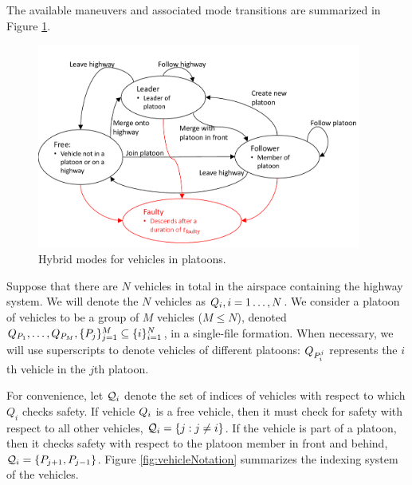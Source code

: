 \begin{itemize}
\end{itemize}

The available maneuvers and associated mode transitions are summarized in Figure \ref{fig:vehicleModes}.

\begin{figure}
	\centering
	\includegraphics[width=0.95\textwidth]{"fig/vehicleModes"}
	\caption{Hybrid modes for vehicles in platoons.}
	\label{fig:vehicleModes}
\end{figure}

Suppose that there are $N$ vehicles in total in the airspace containing the highway system. We will denote the $N$ vehicles as $Q_{i}, i=1\ldots,N$. We consider a platoon of vehicles to be a group of $M$ vehicles ($M\le N$), denoted $Q_{P_1}, \ldots, Q_{P_M}, \{P_j\}_{j=1}^M \subseteq \{i\}_{i=1}^N$, in a single-file formation. When necessary, we will use superscripts to denote vehicles of different platoons: $Q_{P_i^j}$ represents the $i$th vehicle in the $j$th platoon. 

For convenience, let $\mathcal{Q}_{i}$ denote the set of indices of vehicles with respect to which $Q_i$ checks safety. If vehicle $Q_{i}$ is a free vehicle, then it must check for safety with respect to all other vehicles, $\mathcal{Q}_{i} = \{j: j\neq i\}$. If the vehicle is part of a platoon, then it checks safety with respect to the platoon member in front and behind, $\mathcal{Q}_{i} = \{P_{j+1}, P_{j-1}\}$. Figure \ref{fig:vehicleNotation} summarizes the indexing system of the vehicles.

